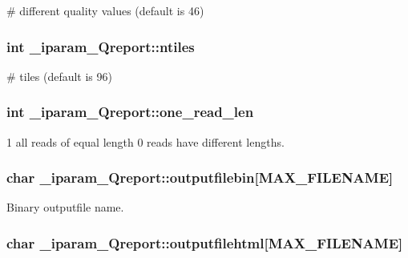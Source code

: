 \# different quality values (default is 46) \hypertarget{struct__iparam__Qreport_a9d91db490f318f69dcea4999f630712e}{
\subsubsection[{ntiles}]{\setlength{\rightskip}{0pt plus 5cm}int \+\_\+iparam\+\_\+\+Qreport\+::ntiles}}\label{struct__iparam__Qreport_a9d91db490f318f69dcea4999f630712e}
\# tiles (default is 96) \hypertarget{struct__iparam__Qreport_a0a09c5cc791e625b948acb45b39164e6}{
\subsubsection[{one\+\_\+read\+\_\+len}]{\setlength{\rightskip}{0pt plus 5cm}int \+\_\+iparam\+\_\+\+Qreport\+::one\+\_\+read\+\_\+len}}\label{struct__iparam__Qreport_a0a09c5cc791e625b948acb45b39164e6}
1 all reads of equal length 0 reads have different lengths. \hypertarget{struct__iparam__Qreport_abdf92f14bc1c49787cda4b94ceb668cd}{
\subsubsection[{outputfilebin}]{\setlength{\rightskip}{0pt plus 5cm}char \+\_\+iparam\+\_\+\+Qreport\+::outputfilebin\mbox{[}{\bf M\+A\+X\+\_\+\+F\+I\+L\+E\+N\+A\+M\+E}\mbox{]}}}\label{struct__iparam__Qreport_abdf92f14bc1c49787cda4b94ceb668cd}
Binary outputfile name. \hypertarget{struct__iparam__Qreport_a54ffbb27584db445494af7d9a1c214de}{
\subsubsection[{outputfilehtml}]{\setlength{\rightskip}{0pt plus 5cm}char \+\_\+iparam\+\_\+\+Qreport\+::outputfilehtml\mbox{[}{\bf M\+A\+X\+\_\+\+F\+I\+L\+E\+N\+A\+M\+E}\mbox{]}}}\label{struct__iparam__Qreport_a54ffbb27584db445494af7d9a1c214de}
